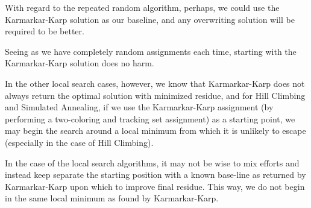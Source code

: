 \documentclass[conference]{styles/acmsiggraph}
\newcommand{\?}{\stackrel{?}{=}}
\DeclareRobustCommand{\mybox}[2][gray!20]{%
\begin{tcolorbox}[   %
        breakable,
        left=0pt,
        right=0pt,
        top=0pt,
        bottom=0pt,
        colback=#1,
        colframe=#1,
        width=\dimexpr\textwidth\relax, 
        enlarge left by=0mm,
        boxsep=5pt,
        arc=0pt,outer arc=0pt,
        ]
        #2
\end{tcolorbox}
}
\begin{document}
\mybox{
With regard to the repeated random algorithm, perhaps, we could use the Karmarkar-Karp solution as our baseline, and any overwriting solution will be required to be better.}
Seeing as we have completely random assignments each time, starting with the Karmarkar-Karp solution does no harm.  \\

\mybox{
In the other local search cases, however, we know that Karmarkar-Karp does not always return the optimal solution with minimized residue, and for Hill Climbing and Simulated Annealing, if we use the Karmarkar-Karp assignment (by performing a two-coloring and tracking set assignment) as a starting point, we may begin the search around a local minimum from which it is unlikely to escape (especially in the case of Hill Climbing).}
In the case of the local search algorithms, it may not be wise to mix efforts and instead keep separate the starting position with a known base-line as returned by Karmarkar-Karp upon which to improve final residue.  This way, we do not begin in the same local minimum as found by Karmarkar-Karp.

\newpage









\end{document}
